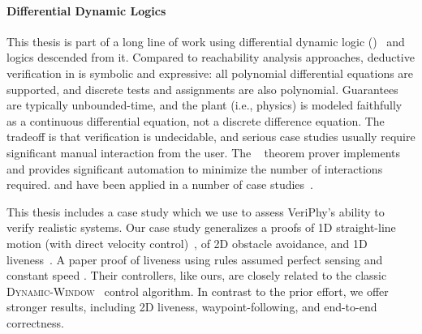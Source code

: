\documentclass[12pt]{cmuthesis}
\theoremstyle{definition}
\theoremstyle{remark}
\newcommand{\VeriPhy}{VeriPhy\xspace}
\begin{document}
\paragraph{Differential Dynamic Logics}
This thesis is part of a long line of work using differential dynamic logic (\dL)~\cite{DBLP:journals/jar/Platzer08,DBLP:conf/lics/Platzer12a,DBLP:journals/jar/Platzer17} and logics descended from it.
Compared to reachability analysis approaches, deductive verification in \dL is symbolic and expressive: all polynomial differential equations are supported, and discrete tests and assignments are also polynomial.
Guarantees are typically unbounded-time, and the plant (i.e., physics) is modeled faithfully as a continuous differential equation, not a discrete difference equation.
The tradeoff is that verification is undecidable, and serious case studies usually require significant manual interaction from the user.
The \KeYmaeraX~\cite{DBLP:conf/cade/FultonMQVP15} theorem prover implements \dL and provides significant automation to minimize the number of interactions required.
\dL and \KeYmaeraX have been applied in a number of case studies~\cite{DBLP:conf/cade/Platzer16}.

This thesis includes a case study which we use to assess \VeriPhy's ability to verify realistic systems.
Our case study generalizes a \dL proofs of 1D straight-line motion (with direct velocity control)~\cite{DBLP:conf/pldi/BohrerTMMP18}, of 2D obstacle avoidance, and 1D liveness~\cite{DBLP:conf/rss/MitschGP13,DBLP:journals/ijrr/MitschGVP17}.
A paper proof of liveness using \dL rules assumed perfect sensing and constant speed \cite{DBLP:journals/corr/abs-1709-02561}.
Their controllers, like ours, are closely related to the classic \textsc{Dynamic-Window}~\cite{DBLP:journals/ram/FoxBT97} control algorithm.
In contrast to the prior \dL effort, we offer stronger results, including 2D liveness, waypoint-following, and end-to-end correctness.

\end{document}
